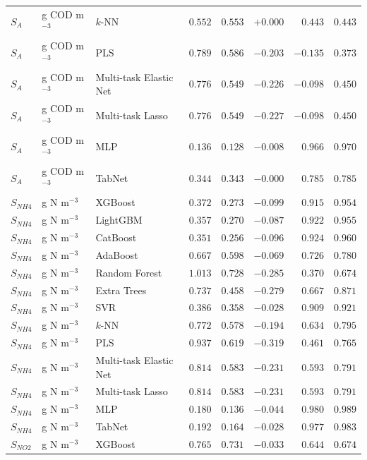 \begin{longtable}{llp{3.1cm}rrrrr}
$S_{A}$ & g COD m$^{-3}$ & $k$-NN & $0.552$ & $0.553$ & $+0.000$ & $0.443$ & $0.443$ \\
$S_{A}$ & g COD m$^{-3}$ & PLS & $0.789$ & $0.586$ & $-0.203$ & $-0.135$ & $0.373$ \\
$S_{A}$ & g COD m$^{-3}$ & Multi-task Elastic Net & $0.776$ & $0.549$ & $-0.226$ & $-0.098$ & $0.450$ \\
$S_{A}$ & g COD m$^{-3}$ & Multi-task Lasso & $0.776$ & $0.549$ & $-0.227$ & $-0.098$ & $0.450$ \\
$S_{A}$ & g COD m$^{-3}$ & MLP & $0.136$ & $0.128$ & $-0.008$ & $0.966$ & $0.970$ \\
$S_{A}$ & g COD m$^{-3}$ & TabNet & $0.344$ & $0.343$ & $-0.000$ & $0.785$ & $0.785$ \\
$S_{NH4}$ & g N m$^{-3}$ & XGBoost & $0.372$ & $0.273$ & $-0.099$ & $0.915$ & $0.954$ \\
$S_{NH4}$ & g N m$^{-3}$ & LightGBM & $0.357$ & $0.270$ & $-0.087$ & $0.922$ & $0.955$ \\
$S_{NH4}$ & g N m$^{-3}$ & CatBoost & $0.351$ & $0.256$ & $-0.096$ & $0.924$ & $0.960$ \\
$S_{NH4}$ & g N m$^{-3}$ & AdaBoost & $0.667$ & $0.598$ & $-0.069$ & $0.726$ & $0.780$ \\
$S_{NH4}$ & g N m$^{-3}$ & Random Forest & $1.013$ & $0.728$ & $-0.285$ & $0.370$ & $0.674$ \\
$S_{NH4}$ & g N m$^{-3}$ & Extra Trees & $0.737$ & $0.458$ & $-0.279$ & $0.667$ & $0.871$ \\
$S_{NH4}$ & g N m$^{-3}$ & SVR & $0.386$ & $0.358$ & $-0.028$ & $0.909$ & $0.921$ \\
$S_{NH4}$ & g N m$^{-3}$ & $k$-NN & $0.772$ & $0.578$ & $-0.194$ & $0.634$ & $0.795$ \\
$S_{NH4}$ & g N m$^{-3}$ & PLS & $0.937$ & $0.619$ & $-0.319$ & $0.461$ & $0.765$ \\
$S_{NH4}$ & g N m$^{-3}$ & Multi-task Elastic Net & $0.814$ & $0.583$ & $-0.231$ & $0.593$ & $0.791$ \\
$S_{NH4}$ & g N m$^{-3}$ & Multi-task Lasso & $0.814$ & $0.583$ & $-0.231$ & $0.593$ & $0.791$ \\
$S_{NH4}$ & g N m$^{-3}$ & MLP & $0.180$ & $0.136$ & $-0.044$ & $0.980$ & $0.989$ \\
$S_{NH4}$ & g N m$^{-3}$ & TabNet & $0.192$ & $0.164$ & $-0.028$ & $0.977$ & $0.983$ \\
$S_{NO2}$ & g N m$^{-3}$ & XGBoost & $0.765$ & $0.731$ & $-0.033$ & $0.644$ & $0.674$ \\

\end{longtable}
